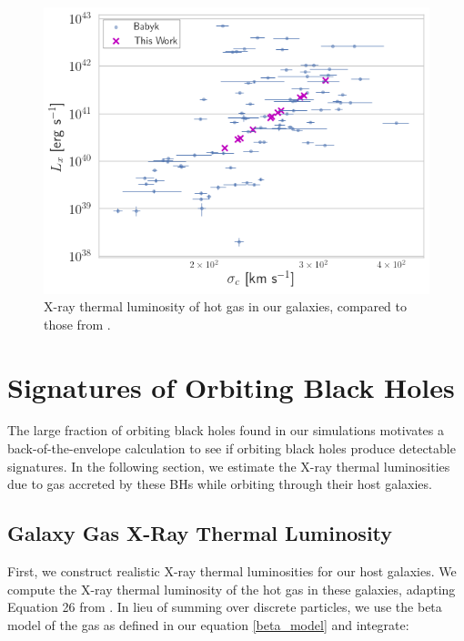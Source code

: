 \documentclass[fleqn,usenatbib,useAMS]{mnras}
\begin{document}
\begin{figure}
\vspace{20pt}%
\begin{center}
\includegraphics[width=1.0\columnwidth]{plots/Lx_of_our_Galaxies_compared_to_Babyk_data.png}
\caption{X-ray thermal luminosity of hot gas in our galaxies, compared to those from \citet{2018ApJ...857...32B}.}
\label{fig:galgas1}
\end{center}
\end{figure}


\section{Signatures of Orbiting Black Holes}
The large fraction of orbiting black holes found in our simulations motivates a back-of-the-envelope calculation to see if orbiting black holes produce detectable signatures. In the following section, we estimate the X-ray thermal luminosities due to gas accreted by these BHs while orbiting through their host galaxies.

\subsection{Galaxy Gas X-Ray Thermal Luminosity}
First, we construct realistic X-ray thermal luminosities for our host galaxies. We compute the X-ray thermal luminosity of the hot gas in these galaxies, adapting Equation 26 from \citet{2012ApJ...754..125C}. In lieu of summing over discrete particles, we use the beta model of the gas as defined in our equation \ref{beta_model} and integrate:
\end{document}
